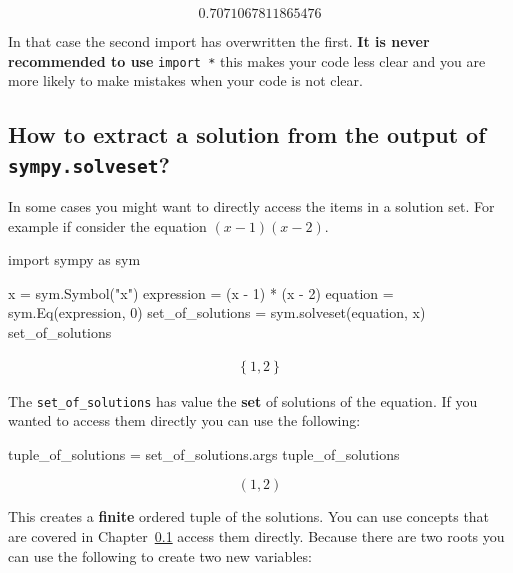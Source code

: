 \begin{pyin}
\[
0.7071067811865476
\]





In that case the second import has overwritten the first.
\textbf{It is never recommended to use} \texttt{import *} this makes your code less clear
and you are more likely to make mistakes when your code is not clear.


\subsection{How to extract a solution from the output of \texttt{sympy.solveset}?}

In some cases you might want to directly access the items in a solution set. For
example if consider the equation \((x - 1)(x -
2)\).

\begin{pyin}
import sympy as sym

x = sym.Symbol("x")
expression = (x - 1) * (x - 2)
equation = sym.Eq(expression, 0)
set_of_solutions = sym.solveset(equation, x)
set_of_solutions
\end{pyin}




\begin{equation*}
\begin{split}\displaystyle \left\{1, 2\right\}\end{split}
\end{equation*}




The \texttt{set\_of\_solutions} has value the \textbf{set} of solutions of the
equation. If you
wanted to access them directly you can use the following:




\begin{pyin}
tuple_of_solutions = set_of_solutions.args
tuple_of_solutions
\end{pyin}





\[
(1, 2)
\]

This creates a \textbf{finite} ordered tuple of the solutions. You can use concepts
that are covered in Chapter~\ref{} %
access them directly. Because there are two roots you can use the following to
create two new variables:


\end{pyin}

